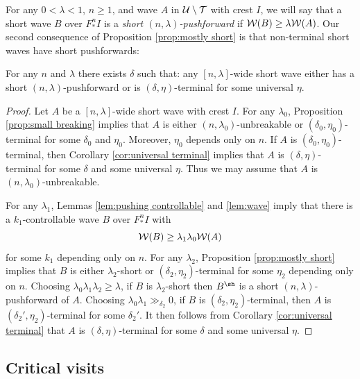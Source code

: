\documentclass[12pt]{amsart}
\begin{document}
For any  $0< \lambda< 1$, $n\geq 1$, and wave $A$ in $\mathcal U\setminus \mathcal T$  with  crest $I$, we will say that a short wave $B$ over $F_*^nI$ is a \textit{short $(n, \lambda)$-pushforward}  if $\mathcal W(B)\geq \lambda\mathcal W(A)$.
Our second consequence of Proposition \ref{prop:mostly short} is that non-terminal short waves have short pushforwards:

\begin{cor}\label{cor:short pushforward}
	For any $n$ and $\lambda$ there exists $\delta$ such that: any $[n, \lambda]$-wide short wave either has a short $(n, \lambda)$-pushforward or is $(\delta, \eta)$-terminal for some universal $\eta$.
\end{cor}

\begin{proof}
	Let $A$ be a $[n, \lambda]$-wide short wave with crest $I$. 
	For any $\lambda_0$, Proposition \ref{prop:small breaking}  implies that 
	$A$ is either  $(n, \lambda_0)$-unbreakable or $(\delta_0, \eta_0)$-terminal for some $\delta_0$ and $\eta_0$.  Moreover, $\eta_0$ depends only on $n$.
	If $A$ is $(\delta_0, \eta_0)$-terminal, then Corollary \ref{cor:universal terminal} implies that $A$ is $(\delta, \eta)$-terminal for some $\delta$ and some universal $\eta$. Thus we may assume that $A$ is $(n, \lambda_0)$-unbreakable.
	
	For any $\lambda_1$,  Lemmas \ref{lem:pushing controllable} and \ref{lem:wave} imply that  there is a  $k_1$-controllable wave $B$ over $F_*^nI$ with  $$\mathcal W(B)\geq \lambda_1\lambda_0\mathcal W(A)$$
	for some $k_1$ depending only on $n$.
	For any $\lambda_2$, Proposition \ref{prop:mostly short} implies that $B$ is either $\lambda_2$-short
	or $(\delta_2, \eta_2)$-terminal for some $\eta_2$ depending only on $n$. 
	Choosing $\lambda_0 \lambda_1\lambda_2\geq \lambda$, if $B$ is $\lambda_2$-short then $B^\sh$ is a short $(n, \lambda)$-pushforward of $A$. 
	Choosing $\lambda_0\lambda_1\gg_{\delta_2} 0$, if  $B$ is $(\delta_2, \eta_2)$-terminal, then $A$ is $(\delta_2', \eta_2)$-terminal for some $\delta_2'$. 
	It then follows from Corollary \ref{cor:universal terminal} that $A$ is $(\delta, \eta)$-terminal for some $\delta$ and some universal $\eta$.	
\end{proof}



\subsection{Critical visits}\label{sec:visits}
\end{document}
